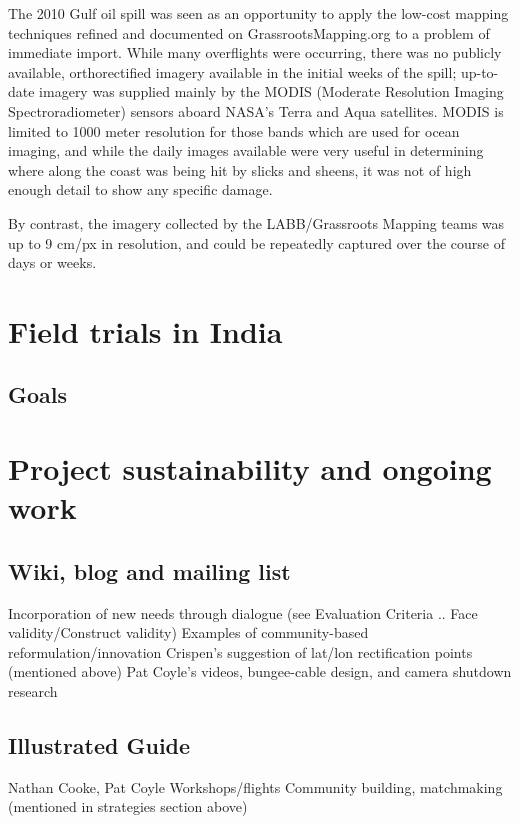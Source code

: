\documentclass[11pt]{report}
\begin{document}

The 2010 Gulf oil spill was seen as an opportunity to apply the low-cost mapping techniques refined and documented on GrassrootsMapping.org to a problem of immediate import. While many overflights were occurring, there was no publicly available, orthorectified imagery available in the initial weeks of the spill; up-to-date imagery was supplied mainly by the MODIS (Moderate Resolution Imaging Spectroradiometer) sensors aboard NASA's Terra and Aqua satellites. MODIS is limited to 1000 meter resolution for those bands which are used for ocean imaging, and while the daily images available were very useful in determining where along the coast was being hit by slicks and sheens, it was not of high enough detail to show any specific damage. 


By contrast, the imagery collected by the LABB/Grassroots Mapping teams was up to 9 cm/px in resolution, and could be repeatedly captured over the course of days or weeks.  


\chapter{Field trials in India}
\section{Goals}

\chapter{Project sustainability and ongoing work}
\section{Wiki, blog and mailing list}
        Incorporation of new needs through dialogue (see Evaluation Criteria .. Face validity/Construct validity)
        Examples of community-based reformulation/innovation
            Crispen's suggestion of lat/lon rectification points (mentioned above)
            Pat Coyle's videos, bungee-cable design, and camera shutdown research

\section{Illustrated Guide}
        Nathan Cooke, Pat Coyle
    Workshops/flights
    Community building, matchmaking (mentioned in strategies section above)
\end{document}
